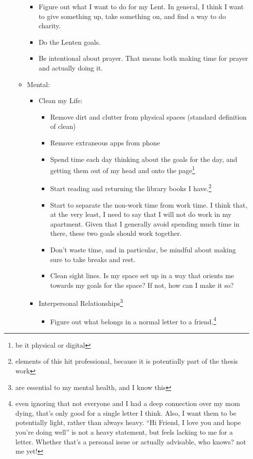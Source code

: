 \documentclass[12pt]{article}[titlepage]
\newcommand{\say}[1]{``#1''}
\renewcommand{\,}{\textsuperscript{,}}
\begin{document}
\begin{itemize}
\begin{itemize}
\begin{itemize}  
\item Figure out what I want to do for my Lent. In general, I think I want to give something up, take something on, and find a way to do charity.  
\item Do the Lenten goals.  
\item Be intentional about prayer. That means both making time for prayer and actually doing it.  
\end{itemize}  
\item Mental:  
\begin{itemize}  
\item Clean my Life:  
\begin{itemize}  
\item Remove dirt and clutter from physical spaces (standard definition of clean)  
\item Remove extraneous apps from phone  
\item Spend time each day thinking about the goals for the day, and getting them out of my head and onto the page\footnote{be it physical or digital}  
\item Start reading and returning the library books I have.\footnote{elements of this hit professional, because it is potentially part of the thesis work}  
\item Start to separate the non-work time from work time. I think that, at the very least, I need to say that I will not do work in my apartment. Given that I generally avoid spending much time in there, these two goals should work together.  
\item Don't waste time, and in particular, be mindful about making sure to take breaks and rest.  
\item Clean sight lines. Is my space set up in a way that orients me towards my goals for the space? If not, how can I make it so?  
\end{itemize}  
\item Interpersonal Relationships\footnote{are essential to my mental health, and I know this}  
\begin{itemize}  
\item Figure out what belongs in a normal letter to a friend.\footnote{even ignoring that not everyone and I had a deep connection over my mom dying, that's only good for a single letter I think. Also, I want them to be potentially light, rather than always heavy. \say{Hi Friend, I love you and hope you're doing well} is not a heavy statement, but feels lacking to me for a letter. Whether that's a personal issue or actually advisable, who knows? not me yet!}  

\end{itemize}
\end{itemize}
\end{itemize}
\end{itemize}
\end{document}
